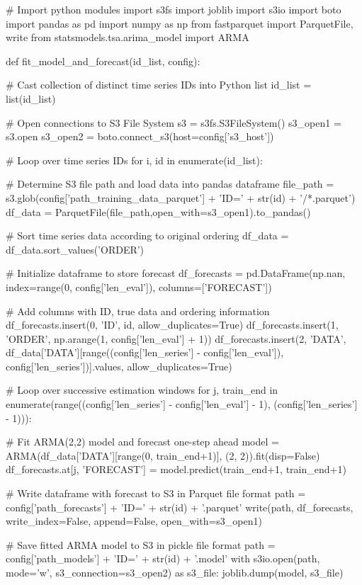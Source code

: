 \documentclass[11pt]{article}
\begin{document}
\begin{python}[caption={\emph{fit\_model\_and\_forecast.py}}]
# Import python modules
import s3fs
import joblib
import s3io
import boto
import pandas as pd
import numpy as np
from fastparquet import ParquetFile, write
from statsmodels.tsa.arima_model import ARMA

def fit_model_and_forecast(id_list, config):

    # Cast collection of distinct time series IDs into Python list
    id_list = list(id_list)

    # Open connections to S3 File System
    s3 = s3fs.S3FileSystem()
    s3_open1 = s3.open
    s3_open2 = boto.connect_s3(host=config['s3_host'])

    # Loop over time series IDs
    for i, id in enumerate(id_list):

        # Determine S3 file path and load data into pandas dataframe
        file_path = s3.glob(config['path_training_data_parquet'] + 'ID=' + str(id) +
                            '/*.parquet')
        df_data = ParquetFile(file_path,open_with=s3_open1).to_pandas()

        # Sort time series data according to original ordering
        df_data = df_data.sort_values('ORDER')

        # Initialize dataframe to store forecast
        df_forecasts = pd.DataFrame(np.nan, index=range(0, config['len_eval']),
                                    columns=['FORECAST'])

        # Add columns with ID, true data and ordering information
        df_forecasts.insert(0, 'ID', id, allow_duplicates=True)
        df_forecasts.insert(1, 'ORDER', np.arange(1, config['len_eval'] + 1))
        df_forecasts.insert(2, 'DATA', df_data['DATA'][range((config['len_series'] -
                                                              config['len_eval']),
                                                             config['len_series'])].values,
                                                             allow_duplicates=True)

        # Loop over successive estimation windows
        for j, train_end in enumerate(range((config['len_series'] - config['len_eval'] - 1), 
                                            (config['len_series'] - 1))):

            # Fit ARMA(2,2) model and forecast one-step ahead
            model = ARMA(df_data['DATA'][range(0, train_end+1)], (2, 2)).fit(disp=False)
            df_forecasts.at[j, 'FORECAST'] = model.predict(train_end+1, train_end+1)

        # Write dataframe with forecast to S3 in Parquet file format
        path = config['path_forecasts'] + 'ID=' + str(id) + '.parquet'
        write(path, df_forecasts, write_index=False, append=False, open_with=s3_open1)

        # Save fitted ARMA model to S3 in pickle file format
        path = config['path_models'] + 'ID=' + str(id) + '.model'
        with s3io.open(path, mode='w', s3_connection=s3_open2) as s3_file:
            joblib.dump(model, s3_file)
\end{python}
\end{document}
